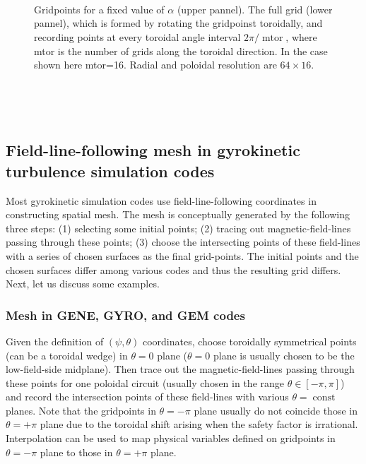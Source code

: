 \documentclass{llncs}
\newcommand{\tmop}[1]{\ensuremath{\operatorname{#1}}}
\begin{document}
\

\

\begin{figure}[h]
  
  \
  
  \caption{Gridpoints for a fixed value of $\alpha$ (upper pannel). The full
  grid (lower pannel), which is formed by rotating the gridpoinst toroidally,
  and recording points at every toroidal angle interval $2 \pi / \tmop{mtor}$,
  where mtor is the number of grids along the toroidal direction. In the case
  shown here mtor=16. Radial and poloidal resolution are $64 \times 16$.}
\end{figure}

\

\

\subsection{Field-line-following mesh in gyrokinetic turbulence simulation
codes}

Most gyrokinetic simulation codes use field-line-following coordinates in
constructing spatial mesh. The mesh is conceptually generated by the following
three steps: (1) selecting some initial points; (2) tracing out
magnetic-field-lines passing through these points; (3) choose the intersecting
points of these field-lines with a series of chosen surfaces as the final
grid-points. The initial points and the chosen surfaces differ among various
codes and thus the resulting grid differs. Next, let us discuss some examples.

\subsubsection{Mesh in GENE, GYRO, and GEM codes}

Given the definition of $(\psi, \theta)$ coordinates, choose toroidally
symmetrical points (can be a toroidal wedge) in $\theta = 0$ plane ($\theta =
0$ plane is usually chosen to be the low-field-side midplane). Then trace out
the magnetic-field-lines passing through these points for one poloidal circuit
(usually chosen in the range $\theta \in [- \pi, \pi]$) and record the
intersection points of these field-lines with various $\theta = \tmop{const}$
planes. Note that the gridpoints in $\theta = - \pi$ plane usually do not
coincide those in $\theta = + \pi$ plane due to the toroidal shift arising
when the safety factor is irrational. Interpolation can be used to map
physical variables defined on gridpoints in $\theta = - \pi$ plane to those in
$\theta = + \pi$ plane.
\end{document}
